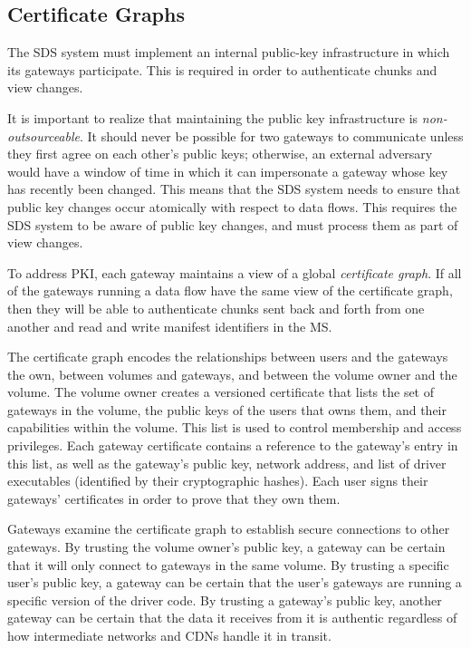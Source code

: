 \subsection{Certificate Graphs}

The SDS system must implement an internal public-key infrastructure in which its
gateways participate.  This is required in order to authenticate chunks and view
changes.

It is important to realize that maintaining the public key infrastructure is
\emph{non-outsourceable}.  It should never be possible for two
gateways to communicate unless they first agree on each other's public keys;
otherwise, an external adversary would have a window of time in which it can
impersonate a gateway whose key has recently been changed.  This means that the
SDS system needs to ensure that public key changes occur atomically with respect
to data flows.  This requires the SDS system to be aware of public key changes,
and must process them as part of view changes.

To address PKI, each gateway maintains a view of a global \emph{certificate graph}.  If all
of the gateways running a data flow have the same view of the certificate graph, then
they will be able to authenticate chunks sent back and forth from one another
and read and write manifest identifiers in the MS.

The certificate graph encodes the relationships between users and the gateways the
own, between volumes and gateways, and between the volume owner and the volume.
The volume owner creates a versioned certificate that lists the set of gateways
in the volume, the public keys of the users that owns them, and their capabilities within the
volume.  This list is used to control membership and access
privileges.  Each gateway certificate contains a reference to the gateway's
entry in this list, as well as the gateway's public key, network address, and list of
driver executables (identified by their cryptographic hashes).  Each user signs
their gateways' certificates in order to prove that they own them.

Gateways examine the certificate graph to establish secure connections to other
gateways.  By trusting the volume owner's public key, a gateway can be certain that it will
only connect to gateways in the same volume.  By trusting a specific user's
public key, a gateway can be certain that the user's gateways are running a specific version
of the driver code.  By trusting a gateway's public key, another gateway can be
certain that the data it receives from it is authentic regardless of how
intermediate networks and CDNs handle it in transit.

